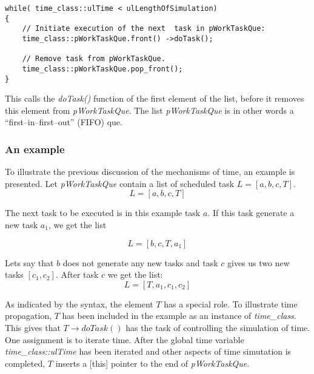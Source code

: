 \begin{lstlisting}
while( time_class::ulTime < ulLengthOfSimulation)
{
	// Initiate execution of the next  task in pWorkTaskQue:
	time_class::pWorkTaskQue.front() ->doTask();

	// Remove task from pWorkTaskQue.
	time_class::pWorkTaskQue.pop_front();
}
\end{lstlisting}

	This calls the \emph{doTask()} function of the first element of the list, before it removes this element from \emph{pWorkTaskQue}.
	The list \emph{pWorkTaskQue} is in other words a ``first--in--first--out'' (FIFO) que. %
	
	\subsubsection{An example}
	To illustrate the previous discussion of the mechanisms of time, an example is presented.
	Let \emph{pWorkTaskQue} contain a list of scheduled task $L = [a, b, c, T]$.
\begin{equation}
	\nonumber
	L = [a, b, c, T]
\end{equation}

	The next task to be executed is in this example task $a$.
	If this task generate a new task $a_1$, we get the list



\begin{equation}
	\nonumber
	L = [b, c, T, a_1]
\end{equation}

Lets say that $b$ does not generate any new tasks and task $c$ gives us two new tasks $[c_1, c_2]$. After task $c$ we get the list:
\begin{equation}
	\nonumber
	L = [T, a_1, c_1, c_2 ]
\end{equation}

As indicated by the syntax, the element $T$ has a special role.
To illustrate time propagation, $T$ has been included in the example as an instance of \emph{time\_class}.
This gives that $T\rightarrow doTask()$ has the task of controlling the simulation of time. 
One assignment is to iterate time.
After the global time variable \emph{time\_class::ulTime} has been iterated and other aspects of time simutation is completed, $T$ inserts a [this] pointer to the end of \emph{pWorkTaskQue}.


